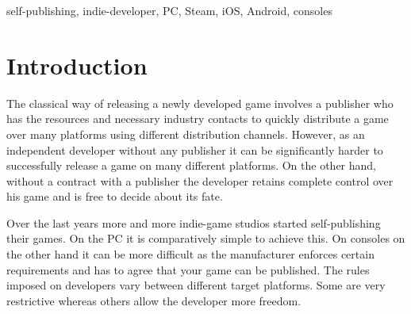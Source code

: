 %
%
%
%
%	
%	
%	

\begin{abstract}
As an independent game developer a successful launch of a game it especially crucial. The task of self-publishing may sound easy but there can be significant challenges. Different platforms and manufacturers have different rules and requirements which have to be met when releasing a game for their system. The following paper explores which options are available for an indie-developer to release their game, how big the challenges for different gaming platforms are and what general strategies should be kept in mind.
\end{abstract}


\begin{keywords}
self-publishing, indie-developer, PC, Steam, iOS, Android, consoles
\end{keywords}


\section{Introduction} 
\label{sec:introduction}
The classical way of releasing a newly developed game involves a publisher who has the resources and necessary industry contacts to quickly distribute a game over many platforms using different distribution channels. However, as an independent developer without any publisher it can be significantly harder to successfully release a game on many different platforms. On the other hand, without a contract with a publisher the developer retains complete control over his game and is free to decide about its fate.

Over the last years more and more indie-game studios started self-publishing their games. On the PC it is comparatively simple to achieve this. On consoles on the other hand it can be more difficult as the manufacturer enforces certain requirements and has to agree that your game can be published. The rules imposed on developers vary between different target platforms. Some are very restrictive whereas others allow the developer more freedom.

